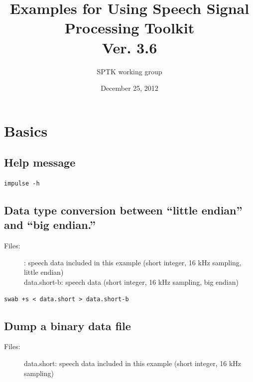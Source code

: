 \documentclass[a4paper,10pt]{article}
\title{
  Examples for Using Speech Signal Processing Toolkit\\
  Ver. 3.6}
\author{SPTK working group}
\date{December 25, 2012}
\begin{document}
\maketitle

\tableofcontents

\newpage

\section{Basics}

\subsection{Help message}

\begin{verbatim}
impulse -h
\end{verbatim}

\subsection{Data type conversion between ``little endian'' and ``big endian.''}

\begin{description}
\item[Files:]
  :
           speech data included in this example (short integer, 16 kHz sampling, little endian)\\
  data.short-b: speech data (short integer, 16 kHz sampling, big endian)
\end{description}
 
\begin{verbatim}
swab +s < data.short > data.short-b
\end{verbatim}

\subsection{Dump a binary data file}

\begin{description}
\item[Files:]
  data.short: speech data included in this example (short integer, 16 kHz sampling)
\end{description}
\end{document}
